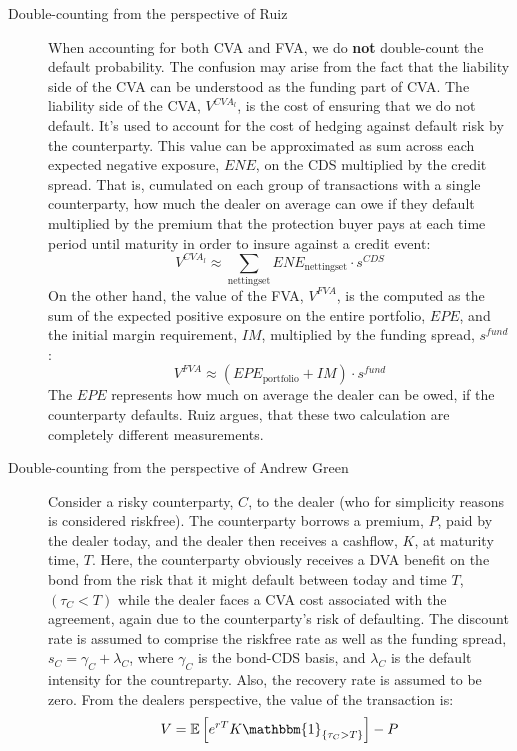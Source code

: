 \documentclass[10pt,a4paper]{article}
\begin{document}
        \begin{description}
            \item[Double-counting from the perspective of Ruiz]
            When accounting for both CVA and FVA, we do \textbf{not} double-count the default probability. The confusion may arise from the fact that the liability side of the CVA can be understood as the funding part of CVA. The liability side of the CVA, $V^{CVA_l}$, is the cost of ensuring that we do not default. It's used to account for the cost of hedging against default risk by the counterparty. This value can be approximated as sum across each expected negative exposure, $ENE$, on the CDS multiplied by the credit spread. That is, cumulated on each group of transactions with a single counterparty, how much the dealer on average can owe if they default multiplied by the premium that the protection buyer pays at each time period until maturity in order to insure against a credit event:
            \begin{equation}
                V^{CVA_l} \approx \sum_{\text{nettingset}} ENE_{\text{nettingset}} \cdot s^{CDS}
            \end{equation}
            On the other hand, the value of the FVA, $V^{FVA}$, is the computed as the sum of the expected positive exposure on the entire portfolio, $EPE$, and the initial margin requirement, $IM$, multiplied by the funding spread, $s^{fund}$:
            \begin{equation}
                V^{FVA} \approx (EPE_{\text{portfolio}}+IM)\cdot s^{fund}
            \end{equation}
            The $EPE$ represents how much on average the dealer can be owed, if the counterparty defaults. Ruiz argues, that these two calculation are completely different measurements.
            \item[Double-counting from the perspective of Andrew Green]
            Consider a risky counterparty, $C$, to the dealer (who for simplicity reasons is considered riskfree). The counterparty borrows a premium, $P$, paid by the dealer today, and the dealer then receives a cashflow, $K$, at maturity time, $T$. Here, the counterparty obviously receives a DVA benefit on the bond from the risk that it might default between today and time $T$, $(\tau_C < T)$ while the dealer faces a CVA cost associated with the agreement, again due to the counterparty's risk of defaulting. The discount rate is assumed to comprise the riskfree rate as well as the funding spread, $s_{C} = \gamma_C + \lambda_C$, where $\gamma_C$ is the bond-CDS basis, and $\lambda_C$ is the default intensity for the countreparty. Also, the recovery rate is assumed to be zero. From the dealers perspective, the value of the transaction is:
            \begin{equation}
                V = \mathbb{E}\left[e^{rT}K \mathbbm{1}_{\{\tau_C > T\}}\right] - P
            \end{equation}
        \end{description}
\end{document}
